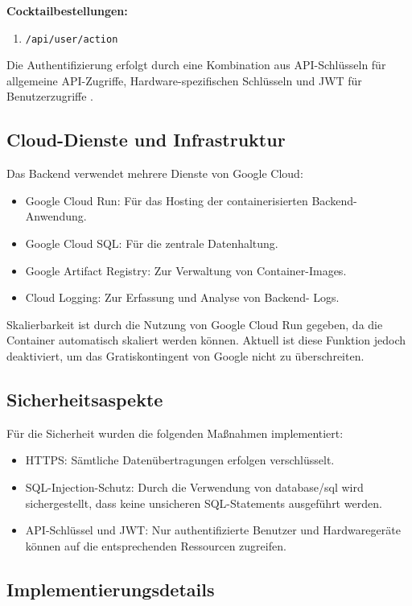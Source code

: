 \vspace{0.5cm}
\textbf{Cocktailbestellungen:}
\begin{enumerate}
  \item \texttt{/api/user/action}
\end{enumerate}

Die Authentifizierung erfolgt durch eine Kombination aus API-Schlüsseln für allgemeine API-Zugriffe, 
Hardware-spezifischen Schlüsseln und JWT für Benutzerzugriffe .

\subsection{Cloud-Dienste und Infrastruktur}

Das Backend verwendet mehrere Dienste von Google Cloud:
\begin{itemize}
	\item Google Cloud Run: Für das Hosting der containerisierten Backend-Anwendung.
	\item Google Cloud SQL: Für die zentrale Datenhaltung.
	\item Google Artifact Registry: Zur Verwaltung von Container-Images.
	\item Cloud Logging: Zur Erfassung und Analyse von Backend- Logs.
\end{itemize}

Skalierbarkeit ist durch die Nutzung von Google Cloud Run gegeben, da die Container automatisch 
skaliert werden können. Aktuell ist diese Funktion jedoch deaktiviert, um das Gratiskontingent von 
Google nicht zu überschreiten.


\subsection{Sicherheitsaspekte}

Für die Sicherheit wurden die folgenden Maßnahmen implementiert:
\begin{itemize}
	\item HTTPS: Sämtliche Datenübertragungen erfolgen verschlüsselt.
	\item SQL-Injection-Schutz: Durch die Verwendung von database/sql wird sichergestellt, dass keine 
unsicheren SQL-Statements ausgeführt werden.
	\item API-Schlüssel und JWT: Nur authentifizierte Benutzer und Hardwaregeräte können auf die 
entsprechenden Ressourcen zugreifen.
\end{itemize}


\subsection{Implementierungsdetails}

